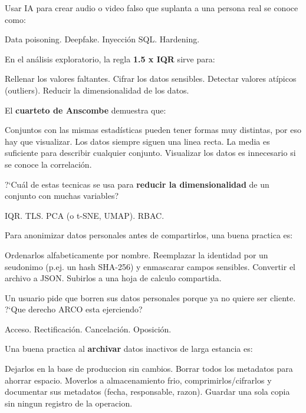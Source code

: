 \documentclass[12pt,addpoints]{exam}
\begin{document}
\begin{questions}
\question[1] Usar IA para crear audio o video falso que suplanta a una persona
real se conoce como:
\begin{choices}
  \choice Data poisoning.
  \CorrectChoice Deepfake.
  \choice Inyecci\'on SQL.
  \choice Hardening.
\end{choices}

\question[1] En el an\'alisis exploratorio, la regla \textbf{1.5 x IQR} sirve
para:
\begin{choices}
  \choice Rellenar los valores faltantes.
  \choice Cifrar los datos sensibles.
  \CorrectChoice Detectar valores at\'ipicos (outliers).
  \choice Reducir la dimensionalidad de los datos.
\end{choices}

\question[1] El \textbf{cuarteto de Anscombe} demuestra que:
\begin{choices}
  \CorrectChoice Conjuntos con las mismas estad\'isticas pueden tener formas muy
    distintas, por eso hay que visualizar.
  \choice Los datos siempre siguen una linea recta.
  \choice La media es suficiente para describir cualquier conjunto.
  \choice Visualizar los datos es innecesario si se conoce la correlaci\'on.
\end{choices}

\question[1] ?`Cu\'al de estas tecnicas se usa para \textbf{reducir la
dimensionalidad} de un conjunto con muchas variables?
\begin{choices}
  \choice IQR.
  \choice TLS.
  \CorrectChoice PCA (o t-SNE, UMAP).
  \choice RBAC.
\end{choices}

\question[1] Para anonimizar datos personales antes de compartirlos, una buena
practica es:
\begin{choices}
  \choice Ordenarlos alfabeticamente por nombre.
  \CorrectChoice Reemplazar la identidad por un seudonimo (p.ej. un hash
    SHA-256) y enmascarar campos sensibles.
  \choice Convertir el archivo a JSON.
  \choice Subirlos a una hoja de calculo compartida.
\end{choices}

\question[1] Un usuario pide que borren sus datos personales porque ya no quiere
ser cliente. ?`Que derecho ARCO esta ejerciendo?
\begin{choices}
  \choice Acceso.
  \choice Rectificaci\'on.
  \CorrectChoice Cancelaci\'on.
  \choice Oposici\'on.
\end{choices}

\question[1] Una buena practica al \textbf{archivar} datos inactivos de larga
estancia es:
\begin{choices}
  \choice Dejarlos en la base de produccion sin cambios.
  \choice Borrar todos los metadatos para ahorrar espacio.
  \CorrectChoice Moverlos a almacenamiento frio, comprimirlos/cifrarlos y
    documentar sus metadatos (fecha, responsable, razon).
  \choice Guardar una sola copia sin ningun registro de la operacion.
\end{choices}

\end{questions}
\end{document}

